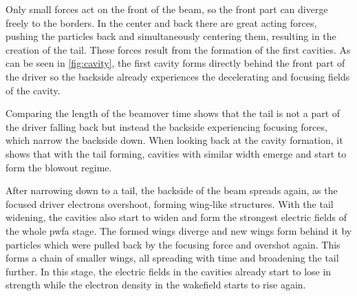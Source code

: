 \documentclass[bachelor_thesis]{subfiles}
\begin{document}
Only small forces act on the front of the beam, so the front part can diverge freely to the borders. In the center and back there are great acting forces, pushing the particles back and simultaneously centering them, resulting in the creation of the tail.
These forces result from the formation of the first cavities. As can be seen in \autoref{fig:cavity}, the first cavity forms directly behind the front part of the driver so the backside already experiences the decelerating and focusing fields of the cavity.
\begin{figure}
	\centering
	\missingfigure{}
	\caption{}
	\label{fig:cavity}
\end{figure}
Comparing the length of the beamover time shows that the tail is not a part of the driver falling back but instead the backside experiencing focusing forces, which narrow the backside down.
When looking back at the cavity formation, it shows that with the tail forming, cavities with similar width emerge and start to form the blowout regime.

After narrowing down to a tail, the backside of the beam spreads again, as the focused driver electrons overshoot, forming wing-like structures. With the tail widening, the cavities also start to widen and form the strongest electric fields of the whole \gls{pwfa} stage.
The formed wings diverge and new wings form behind it by particles which were pulled back by the focusing force and overshot again. This forms a chain of smaller wings, all spreading with time and broadening the tail further.
In this stage, the electric fields in the cavities already start to lose in strength while the electron density in the wakefield starts to rise again.
\end{document}
